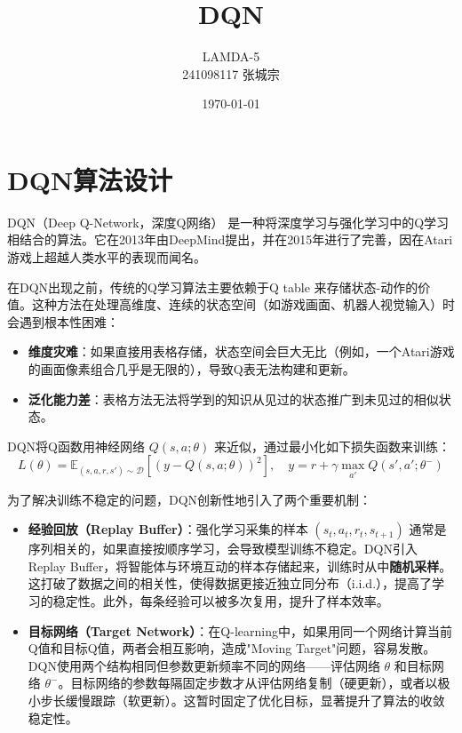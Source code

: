 \documentclass{article}
\title{DQN}
\author{LAMDA-5\\241098117 张城宗}
\date{\today}
\begin{document}
\maketitle

\section{DQN算法设计}

DQN（Deep Q-Network，深度Q网络） 是一种将深度学习与强化学习中的Q学习相结合的算法。它在2013年由DeepMind提出，并在2015年进行了完善，因在Atari游戏上超越人类水平的表现而闻名。

在DQN出现之前，传统的Q学习算法主要依赖于Q table 来存储状态-动作的价值。这种方法在处理高维度、连续的状态空间（如游戏画面、机器人视觉输入）时会遇到根本性困难：
\begin{itemize}
    \item \textbf{维度灾难}：如果直接用表格存储，状态空间会巨大无比（例如，一个Atari游戏的画面像素组合几乎是无限的），导致Q表无法构建和更新。
    \item \textbf{泛化能力差}：表格方法无法将学到的知识从见过的状态推广到未见过的相似状态。
\end{itemize}

DQN将Q函数用神经网络 $Q(s,a;\theta)$ 来近似，通过最小化如下损失函数来训练：
$$L(\theta) = \mathbb{E}_{(s,a,r,s') \sim \mathcal{D}}\left[\left(y - Q(s,a;\theta)\right)^2\right], \quad y = r + \gamma \max_{a'} Q(s', a'; \theta^-)$$

为了解决训练不稳定的问题，DQN创新性地引入了两个重要机制：
\begin{itemize}
    \item \textbf{经验回放（Replay Buffer）}：强化学习采集的样本 $(s_t, a_t, r_t, s_{t+1})$ 通常是序列相关的，如果直接按顺序学习，会导致模型训练不稳定。DQN引入Replay Buffer，将智能体与环境互动的样本存储起来，训练时从中\textbf{随机采样}。这打破了数据之间的相关性，使得数据更接近独立同分布（i.i.d.），提高了学习的稳定性。此外，每条经验可以被多次复用，提升了样本效率。

    \item \textbf{目标网络（Target Network）}：在Q-learning中，如果用同一个网络计算当前Q值和目标Q值，两者会相互影响，造成"Moving Target"问题，容易发散。DQN使用两个结构相同但参数更新频率不同的网络——评估网络 $\theta$ 和目标网络 $\theta^-$。目标网络的参数每隔固定步数才从评估网络复制（硬更新），或者以极小步长缓慢跟踪（软更新）。这暂时固定了优化目标，显著提升了算法的收敛稳定性。
\end{itemize}
\end{document}
